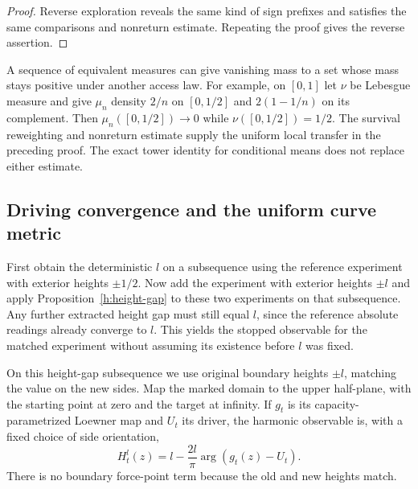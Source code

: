 \begin{proof}
Reverse exploration reveals the same kind of sign prefixes and
satisfies the same comparisons and nonreturn estimate. Repeating
the proof gives the reverse assertion.
\end{proof}

\begin{remark}
A sequence of equivalent measures can give vanishing mass to a set
whose mass stays positive under another access law. For example,
on $[0,1]$ let $\nu$ be Lebesgue measure and give $\mu_n$ density $2/n$
on $[0,1/2]$ and $2(1-1/n)$ on its complement. Then
$\mu_n([0,1/2])\to0$ while $\nu([0,1/2])=1/2$.
The survival reweighting and nonreturn estimate supply the uniform
local transfer in the preceding proof. The exact tower identity
for conditional means does not replace either estimate.
\end{remark}

\subsection{Driving convergence and the uniform curve metric}

First obtain the deterministic $l$ on a subsequence using the reference
experiment with exterior heights $\pm1/2$. Now add the experiment with
exterior heights $\pm l$ and apply Proposition~\ref{h:height-gap} to
these two experiments on that subsequence. Any further extracted
height gap must still equal $l$, since the reference absolute readings
already converge to $l$. This yields the stopped observable for
the matched experiment without assuming its existence before
$l$ was fixed.

On this height-gap subsequence we use original boundary heights
$\pm l$, matching the value on the
new sides. Map the marked domain to the upper half-plane, with the
starting point at zero and the target at infinity. If $g_t$ is its
capacity-parametrized Loewner map and $U_t$ its driver, the harmonic
observable is, with a fixed choice of side orientation,
\begin{equation}\label{h:angle}
 H^l_t(z)=l-\frac{2l}{\pi}\arg(g_t(z)-U_t).
\end{equation}
There is no boundary force-point term because the old and new heights
match.

